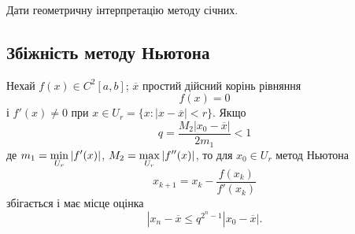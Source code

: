 \begin{problem} 
	Дати геометричну інтерпретацію методу січних.
\end{problem}

\subsection{Збіжність методу Ньютона}

\begin{theorem}
	Нехай $f(x)\in C^2 [a,b]$; $\overline{x}$ простий дійсний корінь рівняння 
	\begin{equation}
		\label{eq:2.10}
		f (x) = 0
	\end{equation}
	і $f'(x) \ne 0$ при $x\in U_r= \{x: |x -\overline{x}| < r\}$. Якщо
	\begin{equation}
		\label{eq:2.11}
		q =  \dfrac{M_2|x_0-\overline{x}|}{2m_1} < 1
	\end{equation}
	де $m_1 = \displaystyle\min\limits_{U_r} |f'(x)|$, $M_2 = \displaystyle\max\limits_{U_r} |f''(x)|$, то для $x_0 \in U_r$ метод Ньютона 
	\begin{equation}
		\label{eq:2.12}
		x_{k+1} = x_k - \dfrac{f(x_k)}{f'(x_k)}
	\end{equation}
	збігається і має місце оцінка
	\begin{equation}
		\label{eq:2.13}
		|x_n - \overline{x} \le q^{2^n-1} |x_0 - \overline{x}|.
	\end{equation}
\end{theorem}


